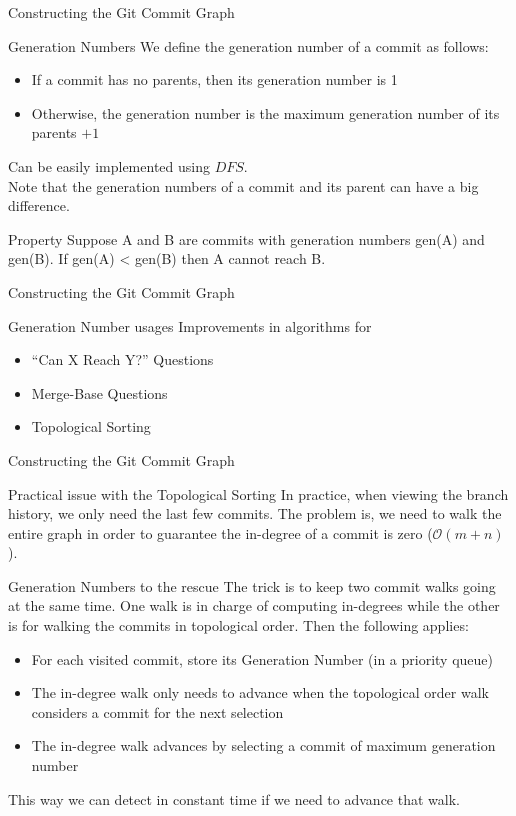 \documentclass{beamer}
\begin{document}
\begin{frame}{Constructing the Git Commit Graph}
  \begin{block}{Generation Numbers}
    We define the generation number of a commit as follows:
    \begin{itemize}
      \item If a commit has no parents, then its generation number is 1
      \item Otherwise, the generation number is the maximum generation number of its parents $+1$
    \end{itemize}
    Can be easily implemented using $DFS$.\\
    Note that the generation numbers of a commit and its parent can have a big difference.
  \end{block}
  \begin{block}{Property}
    Suppose A and B are commits with generation numbers gen(A) and gen(B). If gen(A) < gen(B) then A cannot reach B.
  \end{block}
\end{frame}

\begin{frame}{Constructing the Git Commit Graph}
  \begin{block}{Generation Number usages}
    Improvements in algorithms for
    \begin{itemize}
      \item “Can X Reach Y?” Questions
      \item Merge-Base Questions
      \item Topological Sorting
    \end{itemize}
  \end{block}
\end{frame}

\begin{frame}{Constructing the Git Commit Graph}
  \begin{block}{Practical issue with the Topological Sorting}
    In practice, when viewing the branch history, we only need the last few commits.
    The problem is, we need to walk the entire graph in order to guarantee the in-degree of a commit is zero ($\mathcal{O}(m+n)$).
  \end{block}
  \begin{block}{Generation Numbers to the rescue}
    The trick is to keep two commit walks going at the same time.
    One walk is in charge of computing in-degrees while the other is for walking the commits in topological order. Then the following applies:
    \begin{itemize}
      \item For each visited commit, store its Generation Number (in a priority queue)
      \item The in-degree walk only needs to advance when the topological order walk considers a commit for the next selection
      \item The in-degree walk advances by selecting a commit of maximum generation number
    \end{itemize}
    This way we can detect in constant time if we need to advance that walk.
  \end{block}
\end{frame}
\end{document}
